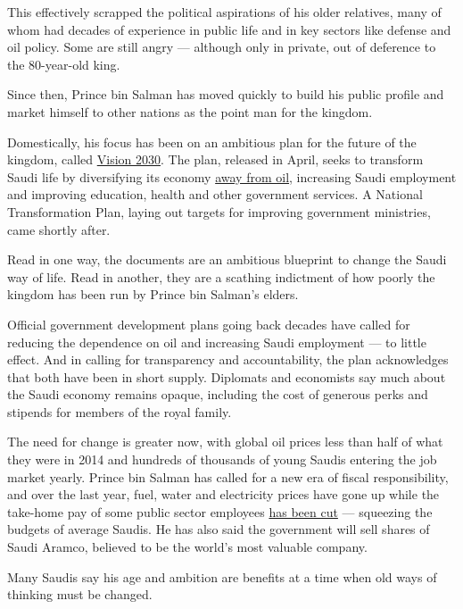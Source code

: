 This effectively scrapped the political aspirations of his older
relatives, many of whom had decades of experience in public life and in
key sectors like defense and oil policy. Some are still angry ---
although only in private, out of deference to the 80-year-old king.

Since then, Prince bin Salman has moved quickly to build his public
profile and market himself to other nations as the point man for the
kingdom.

Domestically, his focus has been on an ambitious plan for the future of
the kingdom, called \href{http://vision2030.gov.sa/en}{Vision 2030}. The
plan, released in April, seeks to transform Saudi life by diversifying
its economy
\href{http://www.nytimes3xbfgragh.onion/2016/04/26/world/middleeast/saudi-prince-shares-planto-cut-oil-dependency-and-energize-the-economy.html}{away
from oil}, increasing Saudi employment and improving education, health
and other government services. A National Transformation Plan, laying
out targets for improving government ministries, came shortly after.

Read in one way, the documents are an ambitious blueprint to change the
Saudi way of life. Read in another, they are a scathing indictment of
how poorly the kingdom has been run by Prince bin Salman's elders.

Official government development plans going back decades have called for
reducing the dependence on oil and increasing Saudi employment --- to
little effect. And in calling for transparency and accountability, the
plan acknowledges that both have been in short supply. Diplomats and
economists say much about the Saudi economy remains opaque, including
the cost of generous perks and stipends for members of the royal family.

The need for change is greater now, with global oil prices less than
half of what they were in 2014 and hundreds of thousands of young Saudis
entering the job market yearly. Prince bin Salman has called for a new
era of fiscal responsibility, and over the last year, fuel, water and
electricity prices have gone up while the take-home pay of some public
sector employees
\href{https://www.nytimes3xbfgragh.onion/2016/09/27/world/middleeast/saudi-arabia-cuts-salaries-oil.html}{has
been cut} --- squeezing the budgets of average Saudis. He has also said
the government will sell shares of Saudi Aramco, believed to be the
world's most valuable company.

Many Saudis say his age and ambition are benefits at a time when old
ways of thinking must be changed.

